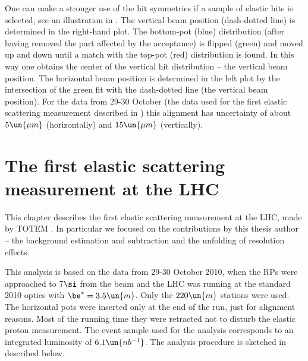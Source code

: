 One can make a stronger use of the hit symmetries if a sample of elastic hits is selected, see an illustration in . The vertical beam position (dash-dotted line) is determined in the right-hand plot. The bottom-pot (blue) distribution (after having removed the part affected by the acceptance) is flipped (green) and moved up and down until a match with the top-pot (red) distribution is found. In this way one obtains the center of the vertical hit distribution -- the vertical beam position. The horizontal beam position is determined in the left plot by the intersection of the green fit with the dash-dotted line (the vertical beam position). For the data from 29-30 October (the data used for the first elastic scattering measurement described in ) this alignment has uncertainty of about $5\un{\mu m}$ (horizontally) and $15\un{\mu m}$ (vertically).


\chapter[felm]{The first elastic scattering measurement at the LHC}

This chapter describes the first elastic scattering measurement at the LHC, made by TOTEM . In particular we focused on the contributions by this thesis author -- the background estimation and subtraction and the unfolding of resolution effects.

This analysis is based on the data from 29-30 October 2010, when the RPs were approached to $7\si$ from the beam and the LHC was running at the standard 2010 optics with $\be^* = 3.5\un{m}$. Only the $220\un{m}$ stations were used. The horizontal pots were inserted only at the end of the run, just for alignment reasons. Most of the running time they were retracted not to disturb the elastic proton measurement. The event sample used for the analysis corresponds to an integrated luminosity of $6.1\un{nb^{-1}}$. The analysis procedure is sketched in  described below.


